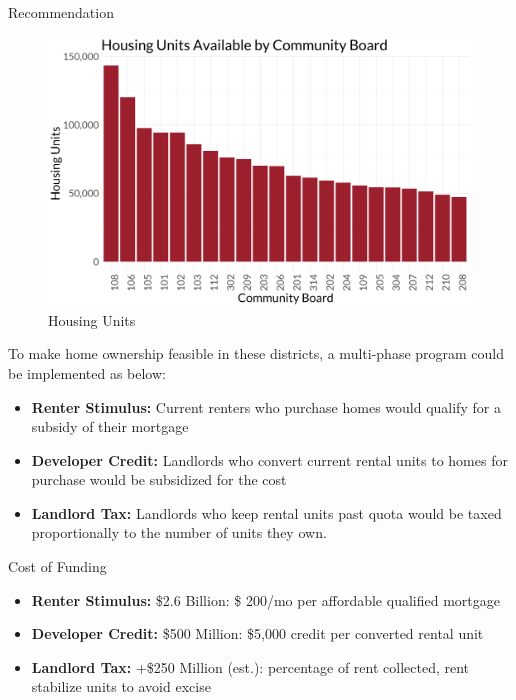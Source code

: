 \documentclass[final]{beamer}
\newlength{\colwidth}
\begin{document}
\begin{frame}[t]
\begin{columns}[t]
\begin{column}{\colwidth}
\begin{block}{Recommendation}
    \begin{figure}
        \centering
        \includegraphics{pics/hunits.png}
        \caption{Housing Units}
        \label{fig:my_label}
    \end{figure}
    
    To make home ownership feasible in these districts, a multi-phase program could be implemented as below:
    
    \begin{itemize}
        \item \textbf{Renter Stimulus:} Current renters who purchase homes would qualify for a subsidy of their mortgage
        \item \textbf{Developer Credit:} Landlords who convert current rental units to homes for purchase would be subsidized for the cost
        \item \textbf{Landlord Tax:} Landlords who keep rental units past quota would be taxed proportionally to the number of units they own. 
    \end{itemize}

  \end{block}
  
  \begin{block}{Cost of Funding}
  
  \begin{itemize}
        \item \textbf{Renter Stimulus:} \$2.6 Billion: \$ 200/mo per affordable qualified mortgage
        \item \textbf{Developer Credit:} \$500 Million: \$5,000 credit per converted rental unit 
        \item \textbf{Landlord Tax:} +\$250 Million (est.): percentage of rent collected, rent stabilize units to avoid excise
    \end{itemize}
    

\end{block}
\end{column}
\end{columns}
\end{frame}
\end{document}
